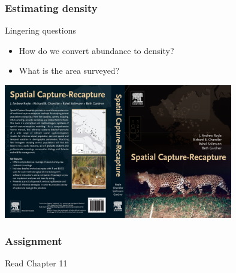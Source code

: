 \documentclass[color=usenames,dvipsnames]{beamer}\usepackage[]{graphicx}\usepackage[]{color}
\begin{document}
\begin{frame}
  \frametitle{Estimating density}
  \large
  {%
    Lingering questions}
  \begin{itemize}
    \item How do we convert abundance to density?
    \item What is the area surveyed?
  \end{itemize}
  \pause
  \begin{center}
    \includegraphics[width=0.75\textwidth]{figs/scrbook}
  \end{center}
\end{frame}




\begin{frame}
  \frametitle{Assignment}
  \centering
  \huge
  Read Chapter 11 \\
\end{frame}
\end{document}
